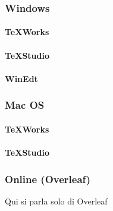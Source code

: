 \documentclass[11pt,b5paper,openany,titlepage,twoside]{book}
\begin{document}


	\subsubsection{Windows}
	\paragraph{\TeX Works}
	\paragraph{\TeX Studio}
	\paragraph{WinEdt}
	\subsubsection{Mac OS}
	\paragraph{\TeX Works}
	\paragraph{\TeX Studio}
	\subsubsection{Online (Overleaf)}
	Qui si parla solo di Overleaf
\end{document}
